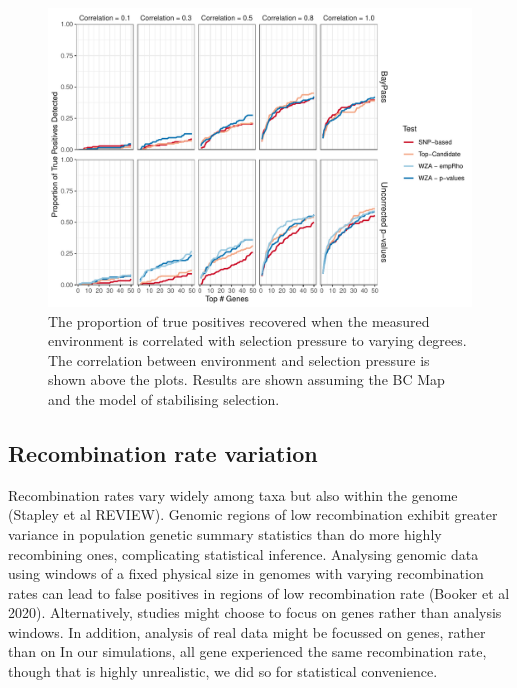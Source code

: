 \documentclass[11pt,twoside,lineno]{GSA_format}
\begin{document}
\begin{figure}[H]
  \includegraphics[width=\linewidth]{Plots/correlatedEnvironments_BCmapResults.pdf} 
  \caption{The proportion of true positives recovered when the measured environment is correlated with selection pressure to varying degrees. The correlation between environment and selection pressure is shown above the plots. Results are shown assuming the BC Map and the model of stabilising selection.}

  \label{fig:truePosStabilising}
\end{figure}




\subsection{Recombination rate variation}

Recombination rates vary widely among taxa but also within the genome (Stapley et al REVIEW). Genomic regions of low recombination exhibit greater variance in population genetic summary statistics than do more highly recombining ones, complicating statistical inference. Analysing genomic data using windows of a fixed physical size in genomes with varying recombination rates can lead to false positives in regions of low recombination rate (Booker et al 2020). Alternatively, studies might choose to focus on genes rather than analysis windows.
In addition, analysis of real data might be focussed on genes, rather than on 
In our simulations, all gene experienced the same recombination rate, though that is highly unrealistic, we did so for statistical convenience.
\end{document}
